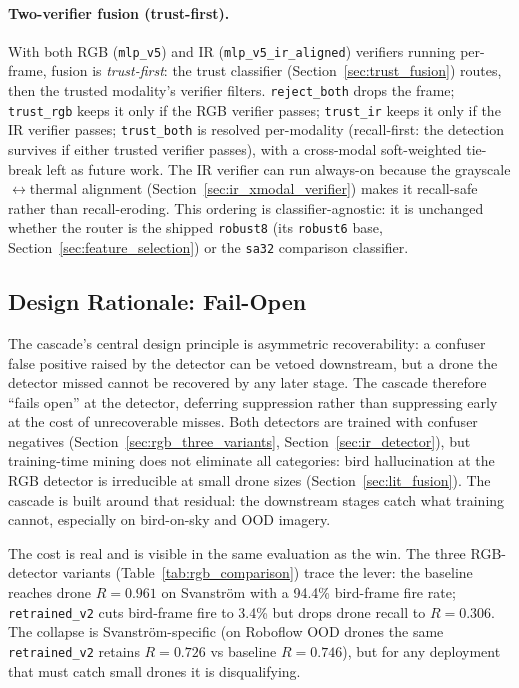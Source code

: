 \paragraph{Two-verifier fusion (trust-first).} With both RGB (\texttt{mlp\_v5}) and IR (\texttt{mlp\_v5\_ir\_aligned}) verifiers running per-frame, fusion is \emph{trust-first}: the trust classifier (Section~\ref{sec:trust_fusion}) routes, then the trusted modality's verifier filters. \texttt{reject\_both} drops the frame; \texttt{trust\_rgb} keeps it only if the RGB verifier passes; \texttt{trust\_ir} keeps it only if the IR verifier passes; \texttt{trust\_both} is resolved per-modality (recall-first: the detection survives if either trusted verifier passes), with a cross-modal soft-weighted tie-break left as future work. The IR verifier can run always-on because the grayscale$\leftrightarrow$thermal alignment (Section~\ref{sec:ir_xmodal_verifier}) makes it recall-safe rather than recall-eroding. This ordering is classifier-agnostic: it is unchanged whether the router is the shipped \texttt{robust8} (its \texttt{robust6} base, Section~\ref{sec:feature_selection}) or the \texttt{sa32} comparison classifier.

\subsection{Design Rationale: Fail-Open}
\label{sec:design_rationale}

The cascade's central design principle is asymmetric recoverability: a confuser false positive raised by the detector can be vetoed downstream, but a drone the detector missed cannot be recovered by any later stage. The cascade therefore ``fails open'' at the detector, deferring suppression rather than suppressing early at the cost of unrecoverable misses. Both detectors are trained with confuser negatives (Section~\ref{sec:rgb_three_variants}, Section~\ref{sec:ir_detector}), but training-time mining does not eliminate all categories: bird hallucination at the RGB detector is irreducible at small drone sizes (Section~\ref{sec:lit_fusion}). The cascade is built around that residual: the downstream stages catch what training cannot, especially on bird-on-sky and OOD imagery.

The cost is real and is visible in the same evaluation as the win. The three RGB-detector variants (Table~\ref{tab:rgb_comparison}) trace the lever: the baseline reaches drone $R=0.961$ on Svanstr\"om with a 94.4\% bird-frame fire rate; \texttt{retrained\_v2} cuts bird-frame fire to 3.4\% but drops drone recall to $R=0.306$. The collapse is Svanstr\"om-specific (on Roboflow OOD drones the same \texttt{retrained\_v2} retains $R=0.726$ vs baseline $R=0.746$), but for any deployment that must catch small drones it is disqualifying.

